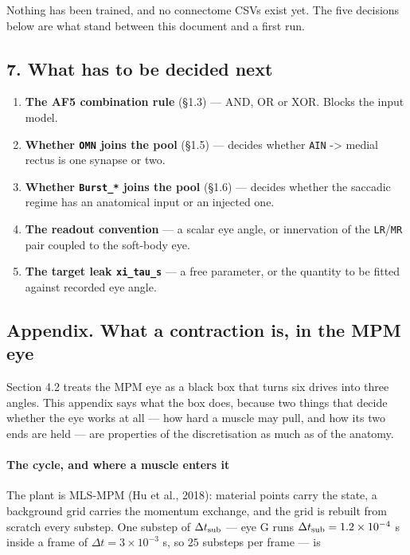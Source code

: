 \documentclass[10pt]{article}
\begin{document}
Nothing has been trained, and no connectome CSVs exist yet. The five decisions below are
what stand between this document and a first run.

\subsection*{7. What has to be decided next}

\begin{enumerate}\setlength{\itemsep}{1pt}
\item \textbf{The AF5 combination rule} (\S{}1.3) --- AND, OR or XOR. Blocks the input
model.
\item \textbf{Whether \texttt{OMN} joins the pool} (\S{}1.5) --- decides whether
\texttt{AIN} -> medial rectus is one synapse or two.
\item \textbf{Whether \texttt{Burst\_*} joins the pool} (\S{}1.6) --- decides whether the
saccadic regime has an anatomical input or an injected one.
\item \textbf{The readout convention} --- a scalar eye angle, or innervation of the
\texttt{LR}/\texttt{MR} pair coupled to the soft-body eye.
\item \textbf{The target leak \texttt{xi\_tau\_s}} --- a free parameter, or the quantity to
be fitted against recorded eye angle.
\end{enumerate}

\subsection*{Appendix. What a contraction is, in the MPM eye}

Section 4.2 treats the MPM eye as a black box that turns six drives into three angles. This
appendix says what the box does, because two things that decide whether the eye works at all
--- how hard a muscle may pull, and how its two ends are held --- are properties of the
discretisation as much as of the anatomy.

\paragraph{The cycle, and where a muscle enters it}

The plant is MLS-MPM (Hu et al., 2018): material points carry the state, a background grid
carries the momentum exchange, and the grid is rebuilt from scratch every substep. One
substep of $\Delta t_{\rm sub}$ --- eye G runs $\Delta t_{\rm sub}=1.2\times10^{-4}$ s
inside a frame of $\Delta t = 3\times10^{-3}$ s, so $25$ substeps per frame --- is
\end{document}
